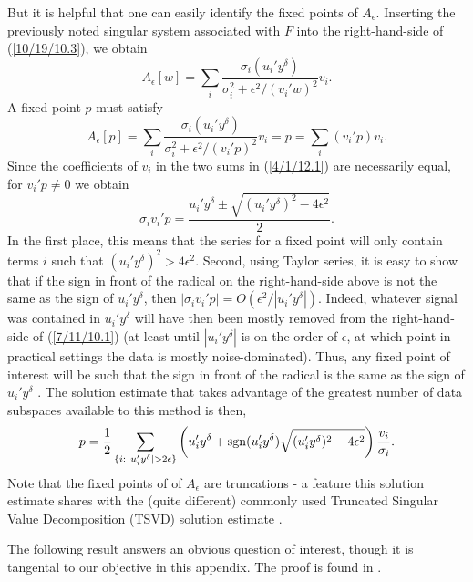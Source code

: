 \documentclass{amsart}
\numberwithin{equation}{section}
\theoremstyle{definition}
\numberwithin{theorem}{section}
\begin{document}
{ 
But it is helpful that one can easily identify the fixed points of $A_\epsilon$. Inserting the previously noted
singular system associated with $F$ into the right-hand-side of (\ref{10/19/10.3}),  we obtain \begin{equation}\label{3/31/12.3} A_\epsilon[w] = \sum_i \frac{\sigma_i (u_i'y^\delta)}{\sigma_i^2 + \epsilon^2/(v_i'w)^2}v_i .\end{equation} A fixed point $p$ must satisfy  \begin{equation}\label{4/1/12.1} A_\epsilon[p] = \sum_i  \frac{\sigma_i (u_i'y^\delta)}{\sigma_i^2 + \epsilon^2/(v_i'p)^2}v_i = p = \sum_i  (v_i' p)v_i.\end{equation}  Since the coefficients of $v_i$ in the two sums in (\ref{4/1/12.1}) are necessarily equal, for $v_i'p\ne 0$ we obtain \begin{equation}\label{7/11/10.1} \sigma_iv_i'p = \frac{u_i' y^\delta \pm \sqrt{(u_i'y^\delta)^2 -4\epsilon^2}}{2}.\end{equation}  In the first place, this means that the series for a fixed point will only contain terms $i$ such that $(u_i'y^\delta)^2 >4\epsilon^2$.  Second, using Taylor series, it is easy to show that if the sign in front of the radical on the right-hand-side above is not the same as the sign of $u_i'y^\delta$, then $|\sigma_i v_i'p| =  O(\epsilon^2/|u_i'y^\delta|)$.  Indeed, whatever signal
 was contained in $u_i'y^\delta$ will have then been mostly 
 removed from the right-hand-side of (\ref{7/11/10.1}) (at least until $|u_i'y^\delta|$ is on the order of $\epsilon$, at which point in practical settings the data is mostly noise-dominated).   Thus, any fixed point of interest will be such that the sign in front of the radical is the same as the sign of $u_i'y^\delta$ .   The solution estimate that takes advantage of the greatest number of data subspaces available to this method is then,
\begin{equation}\label{7/19/10.1} p = \frac{1}{2}\sum_{\{i:\,|u_i'y^\delta|>2\epsilon\}} \left(u_i' y^\delta + {\rm sgn}(u_i' y^\delta) \sqrt{(u_i'y^\delta)^2 -4\epsilon^2}\right)\frac{v_i}{\sigma_i}.\end{equation}      
Note that the fixed points of of $A_\epsilon$ are truncations - a feature this solution estimate shares with the (quite different)  commonly used Truncated Singular Value Decomposition (TSVD) solution estimate \cite{vogel:2002}.  

The following result answers an obvious question of interest, though it is tangental to our objective in this appendix.  The proof is found in \cite{fgreensite:2022d}.


}
\end{document}
